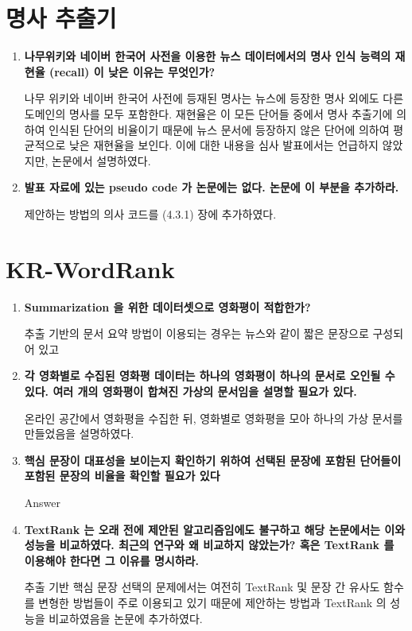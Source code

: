 \documentclass[11pt]{article}
\begin{document}
\section{명사 추출기}
\begin{enumerate}
\item \textbf{나무위키와 네이버 한국어 사전을 이용한 뉴스 데이터에서의 명사 인식 능력의 재현율 (recall) 이 낮은 이유는 무엇인가?}

나무 위키와 네이버 한국어 사전에 등재된 명사는 뉴스에 등장한 명사 외에도 다른 도메인의 명사를 모두 포함한다.
재현율은 이 모든 단어들 중에서 명사 추출기에 의하여 인식된 단어의 비율이기 때문에 뉴스 문서에 등장하지 않은 단어에 의하여 평균적으로 낮은 재현율을 보인다. 
이에 대한 내용을 심사 발표에서는 언급하지 않았지만, 논문에서 설명하였다.

\item \textbf{발표 자료에 있는 pseudo code 가 논문에는 없다. 논문에 이 부분을 추가하라.}

제안하는 방법의 의사 코드를 (4.3.1) 장에 추가하였다.

\end{enumerate}


\section{KR-WordRank}
\begin{enumerate}
\item \textbf{Summarization 을 위한 데이터셋으로 영화평이 적합한가?}

추출 기반의 문서 요약 방법이 이용되는 경우는 뉴스와 같이 짧은 문장으로 구성되어 있고

\item \textbf{각 영화별로 수집된 영화평 데이터는 하나의 영화평이 하나의 문서로 오인될 수 있다. 여러 개의 영화평이 합쳐진 가상의 문서임을 설명할 필요가 있다.}

온라인 공간에서 영화평을 수집한 뒤, 영화별로 영화평을 모아 하나의 가상 문서를 만들었음을 설명하였다.

\item \textbf{핵심 문장이 대표성을 보이는지 확인하기 위하여 선택된 문장에 포함된 단어들이 포함된 문장의 비율을 확인할 필요가 있다}

Answer

\item \textbf{TextRank 는 오래 전에 제안된 알고리즘임에도 불구하고 해당 논문에서는 이와 성능을 비교하였다. 최근의 연구와 왜 비교하지 않았는가? 혹은 TextRank 를 이용해야 한다면 그 이유를 명시하라.}

추출 기반 핵심 문장 선택의 문제에서는 여전히 TextRank 및 문장 간 유사도 함수를 변형한 방법들이 주로 이용되고 있기 때문에 제안하는 방법과 TextRank 의 성능을 비교하였음을 논문에 추가하였다.

\end{enumerate}
\end{document}
